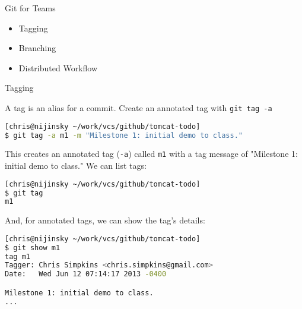 \documentclass{beamer}
\author[Chris Simpkins] 
{Christopher Simpkins \\\texttt{chris.simpkins@gatech.edu}}
\institute[Georgia Tech] %
\date[CS 1331]{}
\begin{document}
\begin{frame}
  \titlepage
\end{frame}




\begin{frame}[fragile]{Git for Teams}


\begin{itemize}
\item Tagging
\item Branching
\item Distributed Workflow
\end{itemize}


\end{frame}

\begin{frame}[fragile]{Tagging}


A tag is an alias for a commit.  Create an annotated tag with {\tt git tag -a}
\begin{lstlisting}[language=bash]
[chris@nijinsky ~/work/vcs/github/tomcat-todo]
$ git tag -a m1 -m "Milestone 1: initial demo to class."
\end{lstlisting}
This creates an annotated tag ({\tt -a}) called {\tt m1} with a tag message of  "Milestone 1: initial demo to class."  We can list tags:
\begin{lstlisting}[language=bash]
[chris@nijinsky ~/work/vcs/github/tomcat-todo]
$ git tag
m1
\end{lstlisting}
And, for annotated tags, we can show the tag's details:
\begin{lstlisting}[language=bash]
[chris@nijinsky ~/work/vcs/github/tomcat-todo]
$ git show m1
tag m1
Tagger: Chris Simpkins <chris.simpkins@gmail.com>
Date:   Wed Jun 12 07:14:17 2013 -0400

Milestone 1: initial demo to class.
...
\end{lstlisting}

\end{frame}
\end{document}
